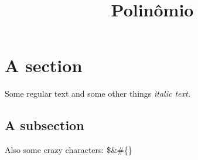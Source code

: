 \documentclass{article}%
\title{Polinômio}%
\begin{document}
%
\normalsize%
\section{A section}%
\label{sec:Asection}%
Some regular text and some other things%
\textit{italic text. }%
\subsection{A subsection}%
\label{subsec:Asubsection}%
Also some crazy characters: \$\&\#\{\}

%
\end{document}
